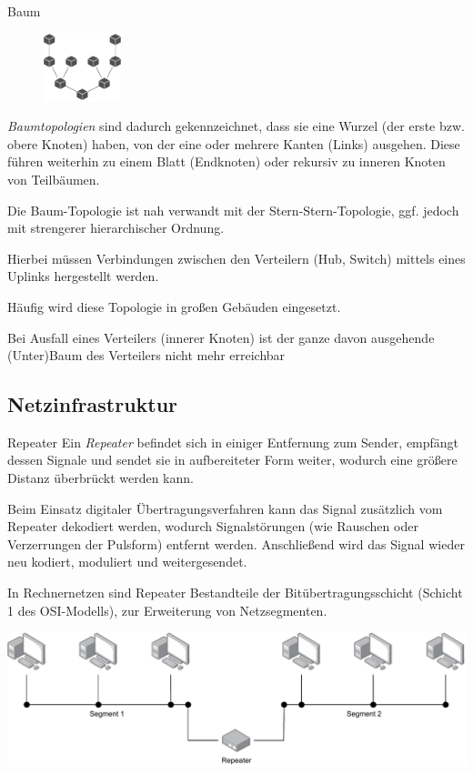 \begin{defi}{Baum}
    \begin{figure}
        \centering
        \includegraphics[width=0.2\textwidth]{includes/figures/defi_baum.pdf}
    \end{figure}%
    \emph{Baumtopologien} sind dadurch gekennzeichnet, dass sie eine Wurzel (der erste bzw. obere Knoten) haben, von der eine oder mehrere Kanten (Links) ausgehen.
    Diese führen weiterhin zu einem Blatt (Endknoten) oder rekursiv zu inneren Knoten von Teilbäumen.

    Die Baum-Topologie ist nah verwandt mit der Stern-Stern-Topologie, ggf. jedoch mit strengerer hierarchischer Ordnung.

    Hierbei müssen Verbindungen zwischen den Verteilern (Hub, Switch) mittels eines Uplinks hergestellt werden.

    Häufig wird diese Topologie in großen Gebäuden eingesetzt.

    Bei Ausfall eines Verteilers (innerer Knoten) ist der ganze davon ausgehende (Unter)Baum des Verteilers nicht mehr erreichbar
\end{defi}

\subsection{Netzinfrastruktur}

\begin{defi}{Repeater}
    Ein \emph{Repeater} befindet sich in einiger Entfernung zum Sender, empfängt dessen Signale und sendet sie in aufbereiteter Form weiter, wodurch eine größere Distanz überbrückt werden kann.

    Beim Einsatz digitaler Übertragungsverfahren kann das Signal zusätzlich vom Repeater dekodiert werden, wodurch Signalstörungen (wie Rauschen oder Verzerrungen der Pulsform) entfernt werden.
    Anschließend wird das Signal wieder neu kodiert, moduliert und weitergesendet.

    In Rechnernetzen sind Repeater Bestandteile der Bitübertragungsschicht (Schicht 1 des OSI-Modells), zur Erweiterung von Netzsegmenten.

    \centering
    \includegraphics[width=.7\textwidth]{includes/figures/defi_repeater.pdf}
\end{defi}

